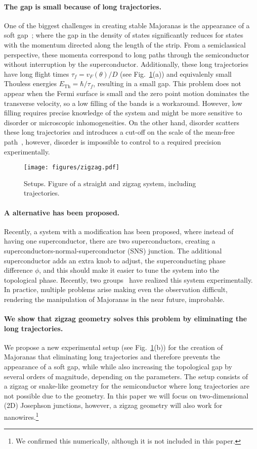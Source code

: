\documentclass[english, twocolumn, 10pt, aps, superscriptaddress, floatfix, prb, citeautoscript]{revtex4-1}
\renewcommand{\comment}[2]{#2}
\renewcommand{\comment}{\paragraph}
\begin{document}
\comment{The gap is small because of long trajectories.}
One of the biggest challenges in creating stable Majoranas is the appearance of a soft gap~\cite{ren_topological_2018}; where the gap in the density of states significantly reduces for states with the momentum directed along the length of the strip.
From a semiclassical perspective, these momenta correspond to long paths through the semiconductor without interruption by the superconductor.
Additionally, these long trajectories have long flight times $\tau_f=v_F(\theta) / D$ (see Fig.~\ref{fig:setup}(a)) and equivalenly small Thouless energies $E_{\textrm{Th}}=\hbar / \tau_f$, resulting in a small gap. %
This problem does not appear when the Fermi surface is small and the zero point motion dominates the transverse velocity, so a low filling of the bands is a workaround\cite{nijholt2015orbital}.
However, low filling requires precise knowledge of the system and might be more sensitive to disorder or microscopic inhomogeneities.
On the other hand, disorder scatters these long trajectories and introduces a cut-off on the scale of the mean-free path~\cite{haim_double-edge_2018}, however, disorder is impossible to control to a required precision experimentally.

\begin{figure}[!htb]
\texttt{[image: figures/zigzag.pdf]}
\caption{Setups. Figure of a straight and zigzag system, including trajectories.
\label{fig:setup}}
\end{figure}

\comment{A alternative has been proposed.}
Recently, a system with a modification has been proposed\cite{pientka2017topological}, where instead of having one superconductor, there are two superconductors, creating a superconductors-normal-superconductor (SNS) junction.
The additional superconductor adds an extra knob to adjust, the superconducting phase difference $\phi$, and this should make it easier to tune the system into the topological phase.
Recently, two groups~\cite{fornieri_evidence_2018,ren_topological_2018} have realized this system experimentally.
In practice, multiple problems arise making even the observation difficult, rendering the manipulation of Majoranas in the near future, improbable.

\comment{We show that zigzag geometry solves this problem by eliminating the long trajectories.}
We propose a new experimental setup (see Fig.~\ref{fig:setup}(b)) for the creation of Majoranas that eliminating long trajectories and therefore prevents the appearance of a soft gap, while while also increasing the topological gap by several orders of magnitude, depending on the parameters.
The setup consists of a zigzag or snake-like geometry for the semiconductor where long trajectories are not possible due to the geometry.
In this paper we will focus on two-dimensional (2D) Josephson junctions, however, a zigzag geometry will also work for nanowires.\footnote{We confirmed this numerically, although it is not included in this paper.}
\end{document}
